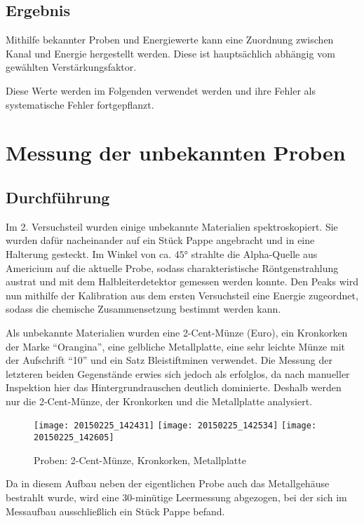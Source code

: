 \documentclass{../Misc/MontavonLaTeX/Montavon}
\newcommand{\thirdwidth}{0.32\textwidth}
\begin{document}
\subsection{Ergebnis}
Mithilfe bekannter Proben und Energiewerte kann eine Zuordnung zwischen Kanal und Energie hergestellt werden. Diese ist hauptsächlich abhängig vom gewählten Verstärkungsfaktor. 

Diese Werte werden im Folgenden verwendet werden und ihre Fehler als systematische Fehler fortgepflanzt.

\section{Messung der unbekannten Proben}
\subsection{Durchführung}
Im 2. Versuchsteil wurden einige unbekannte Materialien spektroskopiert. Sie wurden dafür nacheinander auf ein Stück Pappe angebracht und in eine Halterung gesteckt. Im Winkel von ca. $45 \unit{\degree}$ strahlte die Alpha-Quelle aus Americium auf die aktuelle Probe, sodass charakteristische Röntgenstrahlung austrat und mit dem Halbleiterdetektor gemessen werden konnte.
Den Peaks wird nun mithilfe der Kalibration aus dem ersten Versuchsteil eine Energie zugeordnet, sodass die chemische Zusammensetzung bestimmt werden kann.

Als unbekannte Materialien wurden eine 2-Cent-Münze (Euro), ein Kronkorken der Marke \enquote{Orangina}, eine gelbliche Metallplatte, eine sehr leichte Münze mit der Aufschrift \enquote{10} und ein Satz Bleistiftminen verwendet.
Die Messung der letzteren beiden Gegenstände erwies sich jedoch als erfolglos, da nach manueller Inspektion hier das Hintergrundrauschen deutlich dominierte. 
Deshalb werden nur die 2-Cent-Münze, der Kronkorken und die Metallplatte analysiert.

\begin{figure}[htbp]
\centering
\texttt{[image: 20150225\_142431]}
\texttt{[image: 20150225\_142534]}
\texttt{[image: 20150225\_142605]}
\caption{Proben: 2-Cent-Münze, Kronkorken, Metallplatte}
\end{figure}

Da in diesem Aufbau neben der eigentlichen Probe auch das Metallgehäuse bestrahlt wurde, wird eine 30-minütige Leermessung abgezogen, bei der sich im Messaufbau ausschließlich ein Stück Pappe befand.
\end{document}
